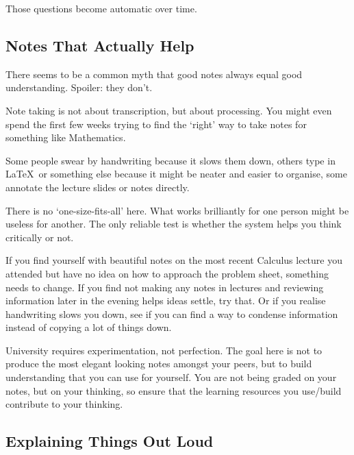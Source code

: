 Those questions become automatic over time. 

\subsection{Notes That Actually Help}


There seems to be a common myth that good notes always equal good understanding. Spoiler: they don't. 

Note taking is not about transcription, but about processing. You might even spend the first few weeks trying to find the `right' way to take notes for something like Mathematics. 

Some people swear by handwriting because it slows them down, others type in \LaTeX \ or something else because it might be neater and easier to organise, some annotate the lecture slides or notes directly.  

There is no `one-size-fits-all' here. What works brilliantly for one person might be useless for another. The only reliable test is whether the system helps you think critically or not. 

If you find yourself with beautiful notes on the most recent Calculus lecture you attended but have no idea on how to approach the problem sheet, something needs to change. If you find not making any notes in lectures and reviewing information later in the evening helps ideas settle, try that. Or if you realise handwriting slows you down, see if you can find a way to condense information instead of copying a lot of things down. 

University requires experimentation, not perfection. The goal here is not to produce the most elegant looking notes amongst your peers, but to build understanding that you can use for yourself. You are not being graded on your notes, but on your thinking, so ensure that the learning resources you use/build contribute to your thinking. 

\subsection{Explaining Things Out Loud}

